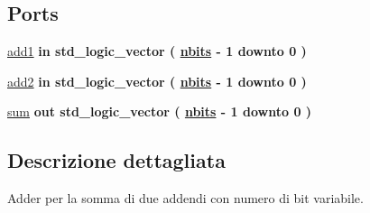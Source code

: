 \subsection*{Ports}
 \begin{DoxyCompactItemize}
\item 
\hyperlink{group___adder_gad6ed6073f8ded668a403a0f7d85c53e8}{add1}  {\bfseries {\bfseries \textcolor{vhdlchar}{in}\textcolor{vhdlchar}{ }}} {\bfseries \textcolor{vhdlchar}{std\+\_\+logic\+\_\+vector}\textcolor{vhdlchar}{ }\textcolor{vhdlchar}{(}\textcolor{vhdlchar}{ }\textcolor{vhdlchar}{ }\textcolor{vhdlchar}{ }\textcolor{vhdlchar}{ }{\bfseries \hyperlink{group___adder_gae8451a648abadfad273ca1ae9b369657}{nbits}} \textcolor{vhdlchar}{-\/}\textcolor{vhdlchar}{ } \textcolor{vhdldigit}{1} \textcolor{vhdlchar}{ }\textcolor{vhdlchar}{downto}\textcolor{vhdlchar}{ }\textcolor{vhdlchar}{ } \textcolor{vhdldigit}{0} \textcolor{vhdlchar}{ }\textcolor{vhdlchar}{)}\textcolor{vhdlchar}{ }} 
\item 
\hyperlink{group___adder_gabf87ad241134c4d313c708910677575e}{add2}  {\bfseries {\bfseries \textcolor{vhdlchar}{in}\textcolor{vhdlchar}{ }}} {\bfseries \textcolor{vhdlchar}{std\+\_\+logic\+\_\+vector}\textcolor{vhdlchar}{ }\textcolor{vhdlchar}{(}\textcolor{vhdlchar}{ }\textcolor{vhdlchar}{ }\textcolor{vhdlchar}{ }\textcolor{vhdlchar}{ }{\bfseries \hyperlink{group___adder_gae8451a648abadfad273ca1ae9b369657}{nbits}} \textcolor{vhdlchar}{-\/}\textcolor{vhdlchar}{ } \textcolor{vhdldigit}{1} \textcolor{vhdlchar}{ }\textcolor{vhdlchar}{downto}\textcolor{vhdlchar}{ }\textcolor{vhdlchar}{ } \textcolor{vhdldigit}{0} \textcolor{vhdlchar}{ }\textcolor{vhdlchar}{)}\textcolor{vhdlchar}{ }} 
\item 
\hyperlink{group___adder_ga01f6ea3ddb4d1519676217bcb5959de8}{sum}  {\bfseries {\bfseries \textcolor{vhdlchar}{out}\textcolor{vhdlchar}{ }}} {\bfseries \textcolor{vhdlchar}{std\+\_\+logic\+\_\+vector}\textcolor{vhdlchar}{ }\textcolor{vhdlchar}{(}\textcolor{vhdlchar}{ }\textcolor{vhdlchar}{ }\textcolor{vhdlchar}{ }\textcolor{vhdlchar}{ }{\bfseries \hyperlink{group___adder_gae8451a648abadfad273ca1ae9b369657}{nbits}} \textcolor{vhdlchar}{-\/}\textcolor{vhdlchar}{ } \textcolor{vhdldigit}{1} \textcolor{vhdlchar}{ }\textcolor{vhdlchar}{downto}\textcolor{vhdlchar}{ }\textcolor{vhdlchar}{ } \textcolor{vhdldigit}{0} \textcolor{vhdlchar}{ }\textcolor{vhdlchar}{)}\textcolor{vhdlchar}{ }} 
\end{DoxyCompactItemize}


\subsection{Descrizione dettagliata}
Adder per la somma di due addendi con numero di bit variabile. 



